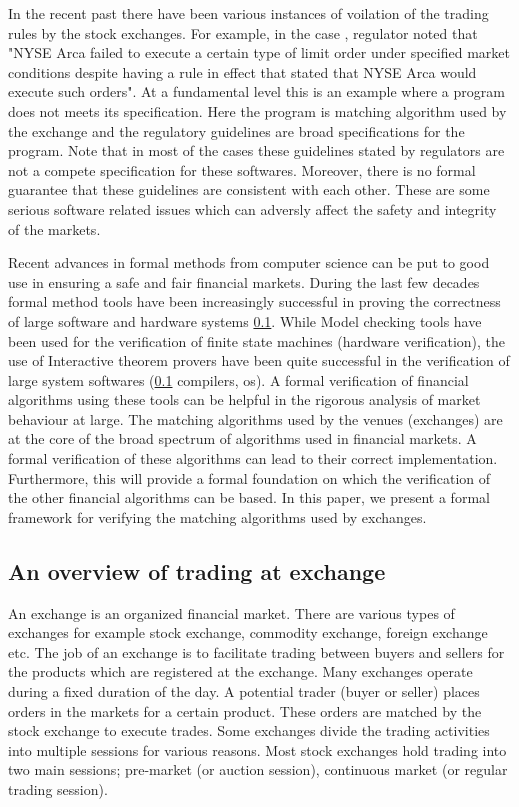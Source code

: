 \documentclass[a4paper,UKenglish,cleveref, autoref]{lipics-v2019}
\begin{document}
In the recent past there have been various instances \cite{nyse1, nyse2, nse} of voilation of the trading rules by the stock exchanges. For example, in the case \cite{nyse1}, regulator noted that "NYSE Arca failed to execute a certain type of limit order under specified market conditions despite having a rule in effect that stated that NYSE Arca would execute such orders". At a fundamental level this is an example where a program does not meets its specification. Here the program is matching algorithm used by the exchange and the regulatory guidelines are  broad specifications for the program. Note that in most of the cases these guidelines stated by regulators are not a compete specification for these softwares. Moreover, there is no formal guarantee that these  guidelines are consistent with each other. These are some serious software related issues which can adversly affect the safety and integrity of the markets. 

Recent advances in formal methods from computer science can be put to good use in ensuring a safe and fair financial markets. During the last few decades formal method tools have been increasingly successful in proving the correctness of large software and hardware systems \ref{}. While Model checking tools have been used for the verification of finite state machines (hardware verification),  the use of Interactive theorem provers have been quite successful in the verification of large system softwares (\ref{} compilers, os). A formal verification of financial algorithms using these tools can be helpful in the rigorous analysis of market behaviour at large. The matching algorithms used by the venues (exchanges) are at the core of the broad spectrum of algorithms used in financial markets. A formal verification of these algorithms can lead to their correct implementation. Furthermore, this will provide a formal foundation on which the verification of the other financial algorithms can be based. In this paper, we present a formal framework for verifying the matching algorithms used by exchanges.

\subsection{An overview of trading at exchange}

An exchange is an organized financial market. There are various types of exchanges for example stock exchange, commodity exchange, foreign exchange etc. The job of an exchange is to facilitate trading between buyers and sellers for the products which are registered at the exchange. Many exchanges operate during a fixed duration of the day. A potential trader (buyer or seller) places orders in the markets for a certain product. These orders are matched by the stock exchange to execute trades. Some exchanges divide the trading activities into multiple sessions for various reasons. Most stock exchanges hold trading into two main sessions; pre-market (or auction session), continuous  market (or regular trading session). 
\end{document}
